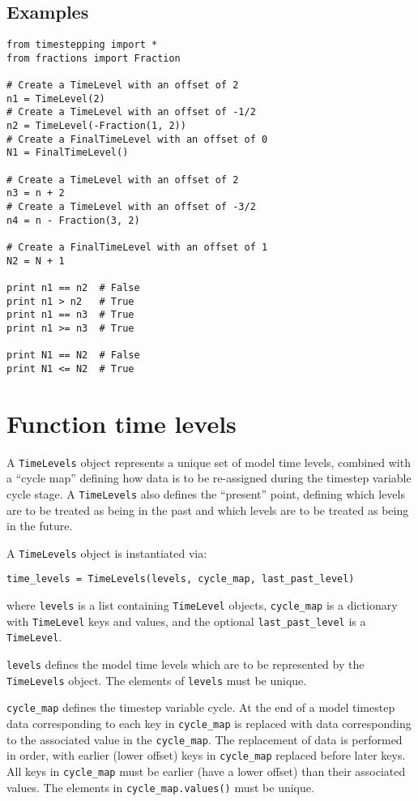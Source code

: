 \documentclass[a4paper]{book}
\begin{document}
\subsection*{Examples}
\begin{lstlisting}
from timestepping import *
from fractions import Fraction

# Create a TimeLevel with an offset of 2
n1 = TimeLevel(2)
# Create a TimeLevel with an offset of -1/2
n2 = TimeLevel(-Fraction(1, 2))
# Create a FinalTimeLevel with an offset of 0
N1 = FinalTimeLevel()

# Create a TimeLevel with an offset of 2
n3 = n + 2
# Create a TimeLevel with an offset of -3/2
n4 = n - Fraction(3, 2)

# Create a FinalTimeLevel with an offset of 1
N2 = N + 1

print n1 == n2  # False
print n1 > n2   # True
print n1 == n3  # True
print n1 >= n3  # True

print N1 == N2  # False
print N1 <= N2  # True
\end{lstlisting}

\section{Function time levels}

A \verb+TimeLevels+ object represents a unique set of model time levels,
combined with a ``cycle map'' defining how data is to be re-assigned during the
timestep variable cycle stage. A \verb+TimeLevels+ also defines the ``present''
point, defining which levels are to be treated as being in the past and which
levels are to be treated as being in the future.

A \verb+TimeLevels+ object is instantiated via:
\begin{lstlisting}
time_levels = TimeLevels(levels, cycle_map, last_past_level)
\end{lstlisting}
where \verb+levels+ is a list containing \verb+TimeLevel+ objects,
\verb+cycle_map+ is a dictionary with \verb+TimeLevel+ keys and values, and the
optional \verb+last_past_level+ is a \verb+TimeLevel+.

\verb+levels+ defines the model time levels which are to be represented by the
\verb+TimeLevels+ object. The elements of \verb+levels+ must be unique.

\verb+cycle_map+ defines the timestep variable cycle. At the end of a model
timestep data corresponding to each key in \verb+cycle_map+ is replaced with
data corresponding to the associated value in the \verb+cycle_map+. The
replacement of data is performed in order, with earlier (lower offset) keys in
\verb+cycle_map+ replaced before later keys. All keys in \verb+cycle_map+ must
be earlier (have a lower offset) than their associated values. The elements in
\verb+cycle_map.values()+ must be unique.
\end{document}
